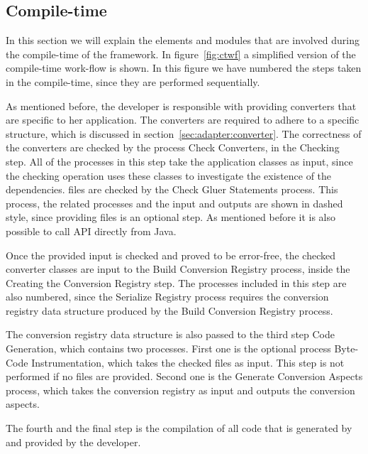 

\subsection{Compile-time}
\label{sec:adapter:compile}

In this section we will explain the elements and modules that are involved during the compile-time of the framework. In figure~\ref{fig:ctwf} a simplified version of the compile-time work-flow is shown.
In this figure we have numbered the steps taken in the compile-time, since they are performed sequentially.


As mentioned before, the developer is responsible with providing converters that are specific to her application. The converters are required to adhere to a specific structure, which is discussed in section~\ref{sec:adapter:converter}. 
The correctness of the converters are checked by the process \textsf{Check Converters}, in the \textsf{Checking} step. 
All of the processes in this step take the application classes as input, since the checking operation uses these classes to investigate the existence of the dependencies. 
\gluer files are checked by the \textsf{Check Gluer Statements} process. This process, the related processes and the input and outputs are shown in dashed style, since providing \gluer files is an optional step. 
As mentioned before it is also possible to call \zamk API directly from Java. 

Once the provided input is checked and proved to be error-free, the checked converter classes are input to the \textsf{Build Conversion Registry} process, inside the \textsf{Creating the Conversion Registry} step. 
The processes included in this step are also numbered, since the \textsf{Serialize Registry} process requires the conversion registry data structure produced by the \textsf{Build Conversion Registry} process.

The conversion registry data structure is also passed to the third step \textsf{Code Generation}, which contains two processes. First one is the optional process \textsf{Byte-Code Instrumentation}, which takes the checked \gluer files as input. 
This step is not performed if no \gluer files are provided.
Second one is the \textsf{Generate Conversion Aspects} process, which takes the conversion registry as input and outputs the conversion aspects. 

The fourth and the final step is the compilation of all code that is generated by \zamk and provided by the developer. 

